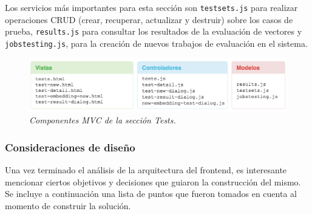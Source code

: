 Los servicios más importantes para esta sección son \texttt{testsets.js} para realizar operaciones
CRUD (crear, recuperar, actualizar y destruir) sobre los casos de prueba, \texttt{results.js} para
consultar los resultados de la evaluación de vectores y \texttt{jobstesting.js}, para la creación de nuevos
trabajos de evaluación en el sistema.

\begin{figure}[h]
    \centering
    \includegraphics[width=\textwidth]{images/ui-nabu-mvc-tests}
    \caption{\textit{Componentes MVC de la sección Tests.}}
    \label{fig:ui-nabu-mvc-tests}
\end{figure}

\subsubsection{Consideraciones de diseño}

Una vez terminado el análisis de la arquitectura del frontend, es interesante mencionar ciertos objetivos y
decisiones que guiaron la construcción del mismo. Se incluye a continuación una lista de puntos que fueron
tomados en cuenta al momento de construir la solución.

